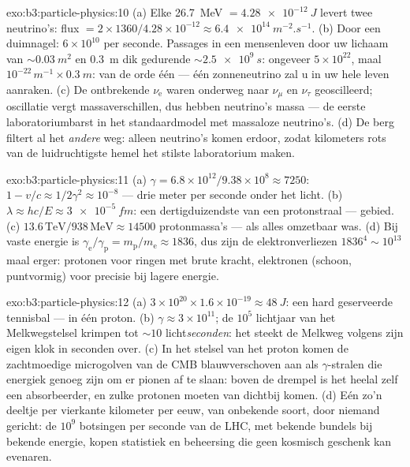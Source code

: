\begin{solution}{exo:b3:particle-physics:10}
(a) Elke \qty{26.7}{MeV} $= \qty{4.28e-12}{J}$ levert twee
neutrino's: flux $= 2\times1360/4.28\times10^{-12} \approx
\qty{6.4e14}{m^{-2}.s^{-1}}$. (b) Door een duimnagel:
$6\times10^{10}$ per seconde. Passages in een mensenleven door uw
lichaam van ${\sim}\qty{0.03}{m^2}$ en \qty{0.3}{m} dik gedurende
${\sim}\qty{2.5e9}{s}$: ongeveer $5\times10^{22}$, maal
$10^{-22}\,\unit{m^{-1}}\times\qty{0.3}{m}$: van de orde één ---
één zonneneutrino zal u in uw hele leven aanraken. (c)
De ontbrekende $\nu_{\text{e}}$ waren onderweg naar $\nu_\mu$ en
$\nu_\tau$ geoscilleerd; oscillatie vergt massaverschillen, dus
hebben neutrino's massa --- de eerste laboratoriumbarst in het
standaardmodel met massaloze neutrino's. (d) De berg filtert al het
\emph{andere} weg: alleen neutrino's komen erdoor, zodat kilometers
rots van de luidruchtigste hemel het stilste laboratorium maken.
\end{solution}

\begin{solution}{exo:b3:particle-physics:11}
(a) $\gamma = 6.8\times10^{12}/9.38\times10^{8} \approx 7250$:
$1 - v/c \approx 1/2\gamma^2 \approx 10^{-8}$ --- drie meter
per seconde onder het licht. (b) $\lambda \approx hc/E \approx
\qty{3e-5}{fm}$: een dertigduizendste van een protonstraal --- \-gebied.
(c) $13.6\,\text{TeV}/938\,\text{MeV} \approx
14500$ protonmassa's --- als alles omzetbaar was. (d) Bij
vaste energie is $\gamma_{\text{e}}/\gamma_{\text{p}} =
m_{\text{p}}/m_{\text{e}} \approx 1836$, dus zijn de elektronverliezen
$1836^4 \sim 10^{13}$ maal erger: protonen voor ringen met brute kracht,
elektronen (schoon, puntvormig) voor precisie bij lagere energie.
\end{solution}

\begin{solution}{exo:b3:particle-physics:12}
(a) $3\times10^{20}\times1.6\times10^{-19} \approx \qty{48}{J}$:
een hard geserveerde tennisbal --- in één proton. (b) $\gamma \approx
3\times10^{11}$; de $10^{5}$ lichtjaar van het Melkwegstelsel krimpen tot
${\sim}10$ licht\emph{seconden}: het steekt de Melkweg volgens zijn
eigen klok in seconden over. (c) In het stelsel van het proton komen de
zachtmoedige microgolven van de CMB blauwverschoven aan als $\gamma$-stralen die
energiek genoeg zijn om er pionen af te slaan: boven de drempel is het heelal
zelf een absorbeerder, en zulke protonen moeten van dichtbij komen. (d) Eén
zo'n deeltje per vierkante kilometer per eeuw, van onbekende
soort, door niemand gericht: de $10^{9}$ botsingen per
seconde van de LHC, met bekende bundels bij bekende energie, kopen statistiek en
beheersing die geen kosmisch geschenk kan evenaren.
\end{solution}

